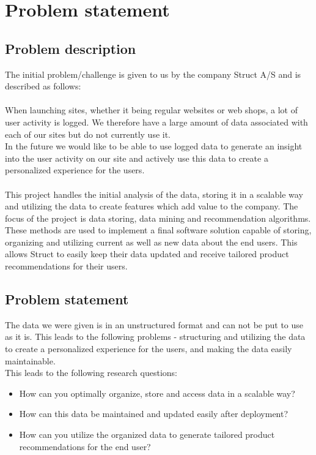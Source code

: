 
\chapter{Problem statement} %

\label{Chapter1} %


\section{Problem description}

The initial problem/challenge is given to us by the company Struct A/S and is described as follows: \\\\
When launching sites, whether it being regular websites or web shops, a lot of user activity is logged. We therefore have a large amount of data associated with each of our sites but do not currently use it. \\
In the future we would like to be able to use logged data to generate an insight into the user activity on our site and actively use this data to create a personalized experience for the users. \\\\

This project handles the initial analysis of the data, storing it in a scalable way and utilizing the data to create features which add value to the company. The focus of the project is data storing, data mining and recommendation algorithms. These methods are used to implement a final software solution capable of storing, organizing and utilizing current as well as new data about the end users. This allows Struct to easily keep their data updated and receive tailored product recommendations for their users.





\section{Problem statement}
The data we were given is in an unstructured format and can not be put to use as it is. This leads to the following problems - structuring and utilizing the data to create a personalized experience for the users, and making the data easily maintainable. \\
This leads to the following research questions:
\begin{itemize}
\item How can you optimally organize, store and access data in a scalable way?
\item How can this data be maintained and updated easily after deployment?
\item How can you utilize the organized data to generate tailored product recommendations for the end user?
\end{itemize}
